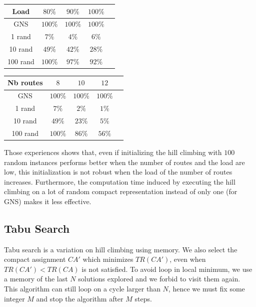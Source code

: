 \documentclass[english]{article}
\begin{document}
\begin{minipage}[c]{.45\linewidth}
\vspace{-0.4cm}
\begin{tabular}{ |c|c|c|c|c| }
\hline
    Load & $80\%$& $90\%$ & $100\%$\\
    \hline
    GNS & $100\%$ & $100\%$& $100\%$ \\
    1 rand & $7\%$ & $4\%$& $6\%$\\
   10 rand & $49\%$& $42\%$& $28\%$\\
   100 rand & $100\%$ & $97\%$& $92\%$\\
    \hline
 \end{tabular}
 \label{tab:descenteload}
\vfill
 \end{minipage}
 \hfill
\begin{minipage}[c]{.45\linewidth}
\vfill
\begin{tabular}{ |c|c|c|c|c| }
\hline
    Nb routes & $8$& $10$ & $12$\\
    \hline
    GNS & $100\%$ & $100\%$& $100\%$ \\
    1 rand & $7\%$ & $2\%$& $1\%$\\
   10 rand & $49\%$& $23\%$& $5\%$\\
   100 rand & $100\%$ & $86\%$& $56\%$\\
    \hline
 \end{tabular}
 \label{tab:descentenbroutes}
\vfill
\end{minipage}

Those experiences shows that, even if initializing the hill climbing with $100$ random instances performs better when the number of routes and the load are low, this initialization is not robust when the load of the number of routes increases. Furthermore, the computation time induced by executing the hill climbing on a lot of random compact representation instead of only one (for GNS) makes it less effective.

\subsection{Tabu Search}

Tabu search is a variation on hill climbing using memory. We also select the compact assignment $CA'$ which minimizes 
$TR(CA')$, even when $TR(CA') < TR(CA)$ is not satisfied. To avoid loop in local minimum, we use a memory of the last 
$N$ solutions explored and we forbid to visit them again. This algorithm can still loop on a cycle larger than $N$,
hence we must fix some integer $M$ and stop the algorithm after $M$ steps.
\end{document}

